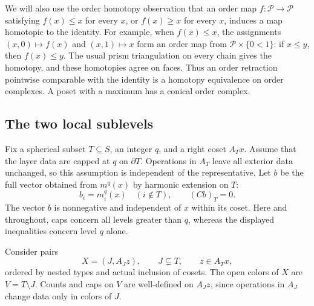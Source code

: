 We will also use the order homotopy observation that an order map
$f:\mathcal P\to\mathcal P$ satisfying $f(x)\le x$ for every $x$, or
$f(x)\ge x$ for every $x$, induces a map homotopic to the identity.
For example, when $f(x)\le x$, the assignments
$(x,0)\mapsto f(x)$ and $(x,1)\mapsto x$ form an order map from
$\mathcal P\times\{0<1\}$: if $x\le y$, then $f(x)\le y$.
The usual prism triangulation on every chain gives the homotopy, and
these homotopies agree on faces.  Thus an order retraction pointwise
comparable with the identity is a homotopy equivalence on order
complexes.  A poset with a maximum has a conical order complex.

\subsection{The two local sublevels}

Fix a spherical subset $T\subseteq S$, an integer $q$, and a right
coset $A_Tx$.  Assume that the layer data are capped at $q$ on
$\partial T$.  Operations in $A_T$ leave all exterior data unchanged,
so this assumption is independent of the representative.  Let $b$ be
the full vector obtained from $m^q(x)$ by harmonic extension on $T$:
\[
 b_i=m_i^q(x)\quad(i\notin T),\qquad (Cb)_T=0.
\]
The vector $b$ is nonnegative and independent of $x$ within its coset.
Here and throughout, caps concern all levels greater than $q$, whereas
the displayed inequalities concern level $q$ alone.

Consider pairs
\begin{equation}
 \label{eq:residues-pairs}
 X=(J,A_Jz),\qquad J\subsetneq T,\qquad z\in A_Tx,
\end{equation}
ordered by nested types and actual inclusion of cosets.  The open
colors of $X$ are $V=T\setminus J$.  Counts and caps on $V$ are
well-defined on $A_Jz$, since operations in $A_J$ change data only
in colors of $J$.

